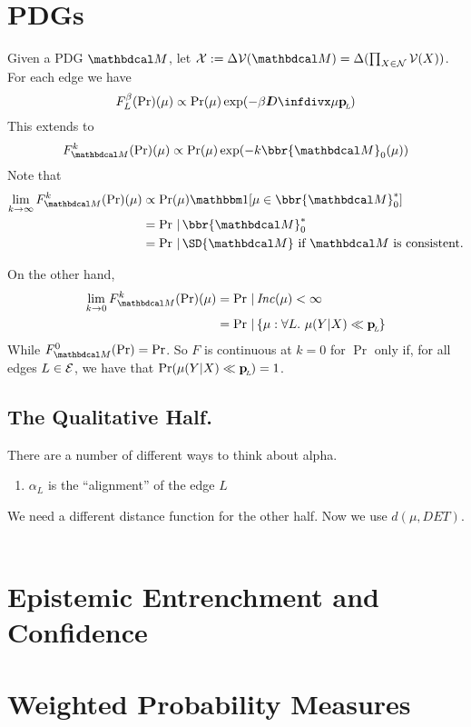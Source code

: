 \documentclass{article}
\begin{document}
\section{PDGs}

Given a PDG $\dg M$, let $\X := \Delta\V(\dg M) = \Delta(\prod_{X\in\N}\V(X))$. For each edge we have
\[ 
    F_L^{\beta}(\Pr) (\mu) \propto \Pr(\mu) \exp(-\beta \kldiv\mu \bp)
\] 
This extends to 
\[
    F_{\dg M}^k(\Pr)(\mu) \propto \Pr(\mu) \exp(- k \bbr{\dg M}_0(\mu))
\]
Note that 
\begin{align*}
    \lim_{k \to \infty} F_{\dg M}^k(\Pr)(\mu) &\propto 
        \Pr(\mu) \mathbbm1[\mu \in {\bbr{\dg M}^*_0}] \\
        &= \Pr \,|\, \bbr{\dg M}^*_0 \\
        &= \Pr \,|\, \SD{\dg M} \text{~if $\dg M$ is consistent.}
\end{align*}

On the other hand,
\begin{align*}
    \lim_{k \to 0} F_{\dg M}^k(\Pr)(\mu) &= \Pr \,|\, \Inc(\mu) < \infty \\
        &= \Pr \,|\, \{\mu : \forall L.~\mu(Y|X) \ll \bp \}
\end{align*}
While $F_{\dg M}^0(\Pr) = \Pr$. So $F$ is continuous at $k=0$ for $\Pr$ only if, for all edges $L \in \mathcal E$, we have that $\Pr(\mu(Y|X) \ll \mathbf{p}_{\!_{L}\!}) = 1$.




\subsection{The Qualitative Half.}
There are a number of different ways to think about alpha.
\begin{enumerate}[nosep]
    \itme $\alpha_L$ is your confidence in the functional dependence of $Y$ on $X$, given 
    \item $\alpha_L$ is the ``alignment'' of the edge $L$
\end{enumerate}

We need a different distance function for the other half. Now we use
$d(\mu, DET)$.

\begin{align*}
    
\end{align*}


\section{Epistemic Entrenchment and Confidence}
\section{Weighted Probability Measures}
\end{document}

